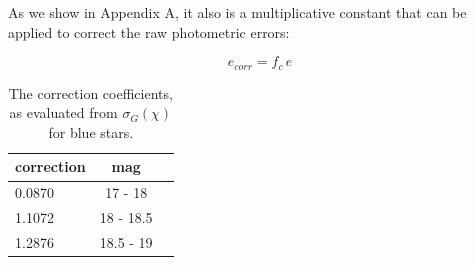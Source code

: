 \documentclass[fleqn,usenatbib]{mnras}  %
\begin{document}
As we show in Appendix A, it also is a multiplicative constant that can be applied to correct the raw photometric errors: 

\begin{equation}
e_{corr} = f_{c} \, e
\end{equation}

\begin{table}
\centering
\caption{The correction coefficients, as evaluated from  $\sigma_{G}(\chi)$ for blue stars.}
\label{tab:fc}
\begin{tabular}{ l|cc } 
correction & mag \\ 
 \hline
0.0870 &  17   - 18  \\
1.1072  &  18   - 18.5  \\
1.2876  &  18.5 - 19  
\end{tabular}
\end{table}
\end{document}
